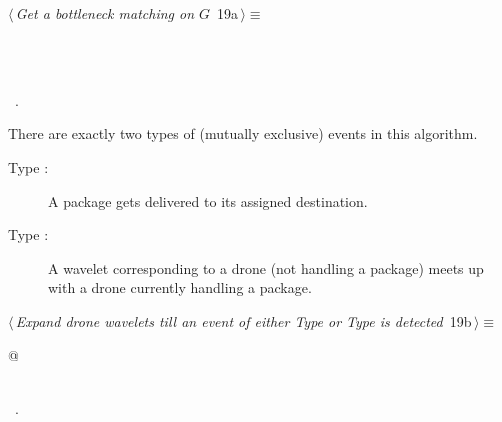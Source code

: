 \documentclass[10pt, english, oneside]{report}
\begin{document}
\begin{flushleft} \small
\begin{minipage}{\linewidth}\label{scrap17}\raggedright\small
{} $\langle\,${\itshape Get a bottleneck matching on $G$}\nobreak\ {\footnotesize {19a}}$\,\rangle\equiv$
\vspace{-1ex}
\begin{list}{}{} \item
\mbox{}\verb@@\\
\mbox{}\verb@@\\
\mbox{}\verb@@{\NWsep}
\end{list}
\vspace{-1.5ex}
\footnotesize
\begin{list}{}{\setlength{\itemsep}{-\parsep}\setlength{\itemindent}{-\leftmargin}}
\item \NWtxtMacroRefIn\ .

\item{}
\end{list}
\end{minipage}\vspace{4ex}
\end{flushleft}

There are exactly two types of (mutually exclusive) events in this algorithm. 

\begin{description}
\item[Type :] A package gets delivered to its assigned destination. 
\item[Type :] A wavelet corresponding to a drone (not handling a package) meets up with 
   a drone currently handling a package. 
\end{description}

\begin{flushleft} \small
\begin{minipage}{\linewidth}\label{scrap18}\raggedright\small
{} $\langle\,${\itshape Expand drone wavelets till an event of either Type  or Type  is detected}\nobreak\ {\footnotesize {19b}}$\,\rangle\equiv$
\vspace{-1ex}
\begin{list}{}{} \item
\mbox{}\verb@   @\\
\mbox{}\verb@pass@\\
\mbox{}\verb@@{\NWsep}
\end{list}
\vspace{-1.5ex}
\footnotesize
\begin{list}{}{\setlength{\itemsep}{-\parsep}\setlength{\itemindent}{-\leftmargin}}
\item \NWtxtMacroRefIn\ .

\item{}
\end{list}
\end{minipage}\vspace{4ex}
\end{flushleft}
\end{document}
